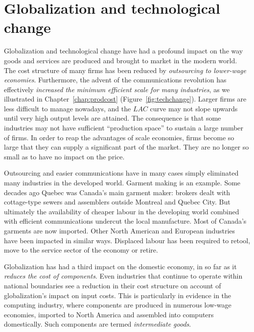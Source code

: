 \section{Globalization and technological change}\label{sec:ch9sec6}

Globalization and technological change have had a profound impact on the way goods and services are produced and brought to market in the modern world. The cost structure of many firms has been reduced by \textit{outsourcing to lower-wage economies}. Furthermore, the advent of the communications revolution has effectively \textit{increased the minimum efficient scale for many industries}, as we illustrated in Chapter~\ref{chap:prodcost} (Figure~\ref{fig:techchange}). Larger firms are less difficult to manage nowadays, and the $LAC$ curve may not slope upwards until very high output levels are attained. The consequence is that some industries may not have sufficient ``production space'' to sustain a large number of firms. In order to reap the advantages of scale economies, firms become so large that they can supply a significant part of the market. They are no longer so small as to have no impact on the price.

Outsourcing and easier communications have in many cases simply eliminated many industries in the developed world. Garment making is an example. Some decades ago Quebec was Canada's main garment maker: brokers dealt with cottage-type sewers and assemblers outside Montreal and Quebec City. But ultimately the availability of cheaper labour in the developing world combined with efficient communications undercut the local manufacture. Most of Canada's garments are now imported. Other North American and European industries have been impacted in similar ways. Displaced labour has been required to retool, move to the service sector of the economy or retire. 

Globalization has had a third impact on the domestic economy, in so far as it \textit{reduces the cost of components}. Even industries that continue to operate within national boundaries see a reduction in their cost structure on account of globalization's impact on input costs. This is particularly in evidence in the computing industry, where components are produced in numerous low-wage economies, imported to North America and assembled into computers domestically. Such components are termed \textit{intermediate goods}.